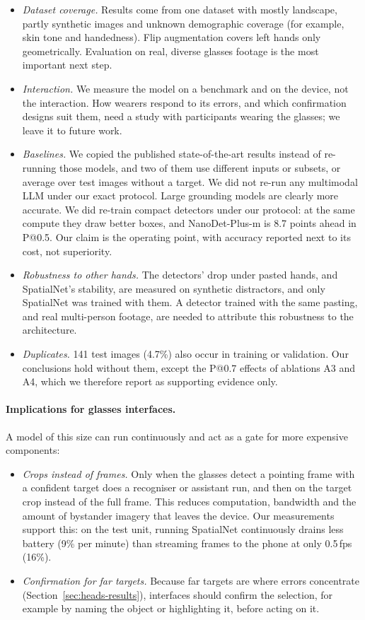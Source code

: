 \begin{itemize}
\item \emph{Dataset coverage.} Results come from one dataset with mostly landscape, partly synthetic images and unknown demographic coverage (for example, skin tone and handedness). Flip augmentation covers left hands only geometrically. Evaluation on real, diverse glasses footage is the most important next step.
\item \emph{Interaction.} We measure the model on a benchmark and on the device, not the interaction. How wearers respond to its errors, and which confirmation designs suit them, need a study with participants wearing the glasses; we leave it to future work.
\item \emph{Baselines.} We copied the published state-of-the-art results instead of re-running those models, and two of them use different inputs or subsets, or average over test images without a target. We did not re-run any multimodal LLM under our exact protocol. Large grounding models are clearly more accurate. We did re-train compact detectors under our protocol: at the same compute they draw better boxes, and NanoDet-Plus-m is 8.7 points ahead in P@0.5. Our claim is the operating point, with accuracy reported next to its cost, not superiority.
\item \emph{Robustness to other hands.} The detectors' drop under pasted hands, and SpatialNet's stability, are measured on synthetic distractors, and only SpatialNet was trained with them. A detector trained with the same pasting, and real multi-person footage, are needed to attribute this robustness to the architecture.
\item \emph{Duplicates.} 141 test images (4.7\%) also occur in training or validation. Our conclusions hold without them, except the P@0.7 effects of ablations A3 and A4, which we therefore report as supporting evidence only.
\end{itemize}

\paragraph{Implications for glasses interfaces.} A model of this size can run continuously and act as a gate for more expensive components:
\begin{itemize}
\item \emph{Crops instead of frames.} Only when the glasses detect a pointing frame with a confident target does a recogniser or assistant run, and then on the target crop instead of the full frame. This reduces computation, bandwidth and the amount of bystander imagery that leaves the device. Our measurements support this: on the test unit, running SpatialNet continuously drains less battery (9\% per minute) than streaming frames to the phone at only 0.5\,fps (16\%).
\item \emph{Confirmation for far targets.} Because far targets are where errors concentrate (Section~\ref{sec:heads-results}), interfaces should confirm the selection, for example by naming the object or highlighting it, before acting on it.
\end{itemize}
